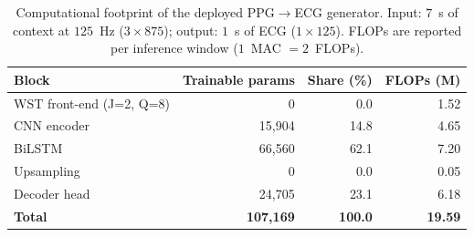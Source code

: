 \begin{table}[t]
\centering
\caption{Computational footprint of the deployed PPG$\rightarrow$ECG generator. Input: $7$~s of context at $125$~Hz ($3\times875$); output: $1$~s of ECG ($1\times125$). FLOPs are reported per inference window ($1$~MAC $=2$~FLOPs).}
\label{tab:complexity}
\begin{tabular}{lrrr}
\toprule
Block & Trainable params & Share (\%) & FLOPs (M) \\
\midrule
WST front-end (J{=}2, Q{=}8) & 0 & 0.0 & 1.52 \\
CNN encoder & 15,904 & 14.8 & 4.65 \\
BiLSTM & 66,560 & 62.1 & 7.20 \\
Upsampling & 0 & 0.0 & 0.05 \\
Decoder head & 24,705 & 23.1 & 6.18 \\
\midrule
\textbf{Total} & \textbf{107,169} & \textbf{100.0} & \textbf{19.59} \\
\bottomrule
\end{tabular}
\end{table}
